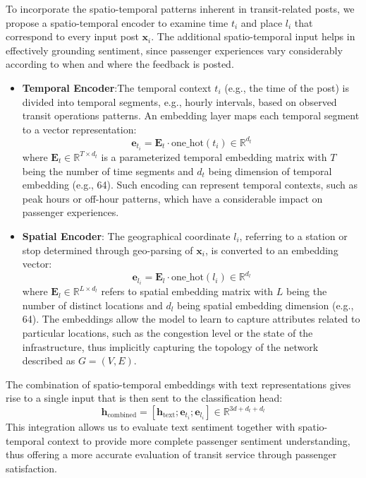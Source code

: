 \documentclass[a4paper,fleqn,12pt]{cas-sc}
\begin{document}
To incorporate the spatio-temporal patterns inherent in transit-related posts, we propose a spatio-temporal encoder to examine time \(t_i\) and place \(l_i\) that correspond to every input post \(\boldsymbol{x}_i\). The additional spatio-temporal input helps in effectively grounding sentiment, since passenger experiences vary considerably according to when and where the feedback is posted.
\begin{itemize}
    \item \textbf{Temporal Encoder}:The temporal context \(t_i\) (e.g., the time of the post) is divided into temporal segments, e.g., hourly intervals, based on observed transit operations patterns. An embedding layer maps each temporal segment to a vector representation:
    \begin{equation}
        \boldsymbol{e}_{t_i} = \boldsymbol{E}_t \cdot \text{one\_hot}(t_i) \in \mathbb{R}^{d_t}
    \end{equation}
    where \(\boldsymbol{E}_t \in \mathbb{R}^{T \times d_t}\) is a parameterized temporal embedding matrix with \(T\) being the number of time segments and \(d_t\) being dimension of temporal embedding (e.g., 64). Such encoding can represent temporal contexts, such as peak hours or off-hour patterns, which have a considerable impact on passenger experiences.

    \item \textbf{Spatial Encoder}: The geographical coordinate \(l_i\), referring to a station or stop determined through geo-parsing of \(\boldsymbol{x}_i\), is converted to an embedding vector:
    \begin{equation}
        \boldsymbol{e}_{l_i} = \boldsymbol{E}_l \cdot \text{one\_hot}(l_i) \in \mathbb{R}^{d_l}
    \end{equation}
    where \(\boldsymbol{E}_l \in \mathbb{R}^{L \times d_l}\) refers to spatial embedding matrix with \(L\) being the number of distinct locations and \(d_l\) being spatial embedding dimension (e.g., 64). The embeddings allow the model to learn to capture attributes related to particular locations, such as the congestion level or the state of the infrastructure, thus implicitly capturing the topology of the network described as \(G = (V, E)\).
\end{itemize}
The combination of spatio-temporal embeddings with text representations gives rise to a single input that is then sent to the classification head:
\begin{equation}
    \boldsymbol{h}_{\text{combined}} = [\boldsymbol{h}_{\text{text}}; \boldsymbol{e}_{t_i}; \boldsymbol{e}_{l_i}] \in \mathbb{R}^{3d + d_t + d_l}
\end{equation}
This integration allows us to evaluate text sentiment together with spatio-temporal context to provide more complete passenger sentiment understanding, thus offering a more accurate evaluation of transit service through passenger satisfaction.
\end{document}
